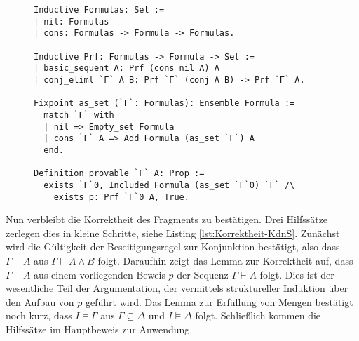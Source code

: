 \begin{figure}[t]
\begin{lstlisting}[language=Coq, xleftmargin=\mathindent, escapechar=`,
label=lst:KdnS, caption={Fragment des natürliches Schließens und Ableitbarkeit}]
Inductive Formulas: Set :=
| nil: Formulas
| cons: Formulas -> Formula -> Formulas.

Inductive Prf: Formulas -> Formula -> Set :=
| basic_sequent A: Prf (cons nil A) A
| conj_eliml `Γ` A B: Prf `Γ` (conj A B) -> Prf `Γ` A.

Fixpoint as_set (`Γ`: Formulas): Ensemble Formula :=
  match `Γ` with
  | nil => Empty_set Formula
  | cons `Γ` A => Add Formula (as_set `Γ`) A
  end.

Definition provable `Γ` A: Prop :=
  exists `Γ`0, Included Formula (as_set `Γ`0) `Γ` /\
    exists p: Prf `Γ`0 A, True.
\end{lstlisting}
\end{figure}

Nun verbleibt die Korrektheit des Fragments zu bestätigen. Drei
Hilfssätze zerlegen dies in kleine Schritte, siehe Listing
\ref{lst:Korrektheit-KdnS}. Zunächst wird die Gültigkeit der
Beseitigungsregel zur Konjunktion bestätigt,
also dass $\Gamma\models A$ aus $\Gamma\models A\land B$ folgt. Daraufhin
zeigt das Lemma zur Korrektheit auf, dass $\Gamma\models A$ aus einem
vorliegenden Beweis $p$ der Sequenz $\Gamma\vdash A$ folgt. Dies ist
der wesentliche Teil der Argumentation, der vermittels struktureller
Induktion über den Aufbau von $p$ geführt wird. Das Lemma zur
Erfüllung von Mengen bestätigt noch kurz, dass $I\models\Gamma$
aus $\Gamma\subseteq\Delta$ und $I\models\Delta$ folgt. Schließlich
kommen die Hilfssätze im Hauptbeweis zur Anwendung.

